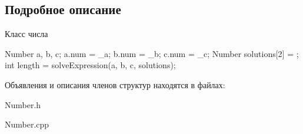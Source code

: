 \subsection{Подробное описание}
Класс числа 
\begin{DoxyCode}
 Number a, b, c;
 a.num = _a;
 b.num = _b;
 c.num = _c;
 Number solutions[2] = {};
 int length = solveExpression(a, b, c, solutions);
\end{DoxyCode}
 

Объявления и описания членов структур находятся в файлах:\begin{DoxyCompactItemize}
\item 
Number.h\item 
Number.cpp\end{DoxyCompactItemize}
